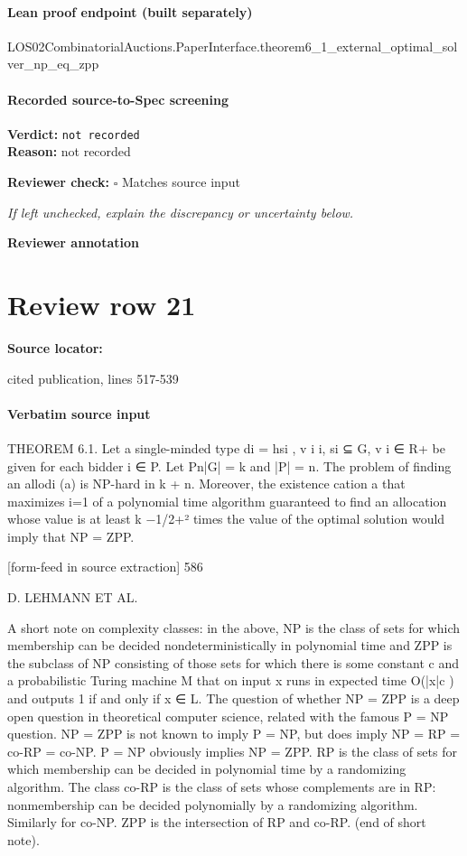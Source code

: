 \documentclass[10pt]{article}
\newcommand{\reviewerbox}{%
  \par\noindent\fbox{\parbox{0.96\linewidth}{\rule{0pt}{0.38in}}}\par
}
\newcommand{\reviewmatch}[1]{%
  \par\noindent\textbf{Reviewer check:} $\square$\; #1\par
  \noindent\emph{If left unchecked, explain the discrepancy or uncertainty below.}\par
}
\begin{document}
\paragraph{Lean proof endpoint (built separately)}\begin{ReviewVerbatim}
LOS02CombinatorialAuctions.PaperInterface.theorem6_1_external_optimal_solver_np_eq_zpp
\end{ReviewVerbatim}

\paragraph{Recorded source-to-Spec screening}
\textbf{Verdict:} \texttt{not recorded}
\\
\textbf{Reason:} not recorded
\reviewmatch{Matches source input}
\noindent\textbf{Reviewer annotation}\par
\reviewerbox
\clearpage
\hypertarget{source-claim-663dfd5b5c9e0312}{}
\section*{Review row 21}
\textbf{Source locator:} {\footnotesize\raggedright cited publication, lines 517-\allowbreak{}539\par}
\paragraph{Verbatim source input}
\begin{ReviewVerbatim}
THEOREM 6.1. Let a single-minded type di = hsi , v i i, si ⊆ G, v i ∈ R+ be given
for each bidder i ∈ P. Let
Pn|G| = k and |P| = n. The problem of finding an allodi (a) is NP-hard in k + n. Moreover, the existence
cation a that maximizes i=1
of a polynomial time algorithm guaranteed to find an allocation whose value is at
least k −1/2+² times the value of the optimal solution would imply that NP = ZPP.


[form-feed in source extraction]
586

D. LEHMANN ET AL.

A short note on complexity classes: in the above, NP is the class of sets for which
membership can be decided nondeterministically in polynomial time and ZPP is
the subclass of NP consisting of those sets for which there is some constant c and a
probabilistic Turing machine M that on input x runs in expected time O(|x|c ) and
outputs 1 if and only if x ∈ L. The question of whether NP = ZPP is a deep open
question in theoretical computer science, related with the famous P = NP question.
NP = ZPP is not known to imply P = NP, but does imply NP = RP = co-RP =
co-NP. P = NP obviously implies NP = ZPP. RP is the class of sets for which
membership can be decided in polynomial time by a randomizing algorithm. The
class co-RP is the class of sets whose complements are in RP: nonmembership can
be decided polynomially by a randomizing algorithm. Similarly for co-NP. ZPP is
the intersection of RP and co-RP. (end of short note).
\end{ReviewVerbatim}
\end{document}
